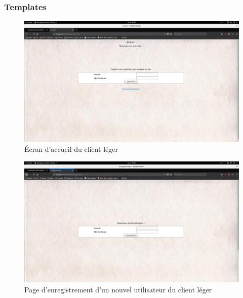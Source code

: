 \documentclass[a4paper, 12pt]{article}
\begin{document}
\subsubsection{Templates}

\begin{figure}[H]
  \begin{center}
    \includegraphics[scale=0.2]{accueil_leger.png}
  \end{center}
  \caption{Écran d'accueil du client léger}
\end{figure}

\begin{figure}[H]
  \begin{center}
    \includegraphics[scale=0.2]{enregistrement_leger.png}
  \end{center}
  \caption{Page d'enregistrement d'un nouvel utilisateur du client léger}
\end{figure}
\end{document}
